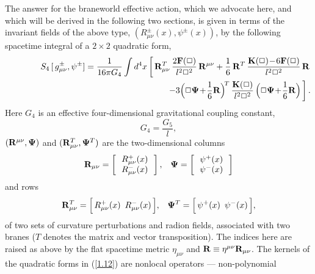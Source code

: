 \documentclass[a4paper,preprint,nofootinbib,
                 showpacs,preprintnumbers,amsmath,amssymb]{revtex4}
\begin{document}
The answer for the braneworld effective action, which we advocate here, 
and which will be derived in the following two sections, 
is given in terms of the invariant fields of the above type, 
$(R^\pm_{\mu\nu}(x),\psi^\pm(x))$, by the following spacetime 
integral of a $2\times2$ quadratic form, 
   \begin{eqnarray} 
   &&S_4\,[\,g^\pm_{\mu\nu},\psi^\pm] 
   =\frac1{16\pi G_4}\int d^4x \left[\,{\bf R}^T_{\mu\nu}\, 
   \frac{2{\bf F}(\Box)}{l^2\Box^2}\,{\bf R}^{\mu\nu} 
   +\frac16\,{\bf R}^{T}\, 
   \frac{{\bf K}(\Box)\!-\!6{\bf F}(\Box)}{l^2\Box^2} 
   \,{\bf R}\right.\nonumber\\ 
   &&\qquad\qquad\qquad\qquad\qquad\qquad\qquad\qquad\qquad 
   \left.-3\Big(\Box{\bf\Psi}\!+\!\frac16{\bf R}\Big)^{\!T}\, 
   \frac{{\bf K}(\Box)}{l^2\Box^2}\, 
   \Big(\Box{\bf\Psi}\!+\!\frac16{\bf R}\Big)\,\right].      \label{1.12} 
   \end{eqnarray} 
Here $G_4$ is an effective four-dimensional gravitational coupling 
constant, 
    \begin{equation} 
    G_4=\frac{G_5}l,                     \label{1.12a} 
    \end{equation} 
$({\bf R}^{\mu\nu},{\bf\Psi})$ and $({\bf 
R}^T_{\mu\nu},{\bf\Psi}^T)$ are the two-dimensional columns 
  \begin{eqnarray} 
   {\bf R}_{\mu\nu} = 
   \left[\begin{array}{c} 
      \,R_{\mu\nu}^+(x)\, \\ \,R_{\mu\nu}^-(x)\, 
  \end{array}\right],\,\,\,\,\, 
  {\bf\Psi}=\left[\begin{array}{c} 
      \,\psi^+(x)\, \\ \, \psi^-(x)\, 
  \end{array}\right]                       \label{1.13a} 
   \end{eqnarray} 
and rows 
   \begin{eqnarray} 
   {\bf R}^T_{\mu\nu}= 
   \Big[\,R^+_{\mu\nu}(x)\,\,\, 
   R^-_{\mu\nu}(x)\,\Big],\,\,\,\,\, 
   {\bf\Psi}^T=\Big[\,\psi^+(x) 
   \,\,\,\psi^-(x)\,\Big],                   \label{1.13} 
  \end{eqnarray} 
of two sets of curvature perturbations and radion fields, 
associated with two branes ($T$ denotes the matrix and vector 
transposition). The indices here are raised as above by the flat 
spacetime metric $\eta_{\mu\nu}$ and ${\bf 
R}\equiv\eta^{\mu\nu}{\bf R}_{\mu\nu}$. The kernels of the quadratic 
forms in (\ref{1.12}) are nonlocal operators --- non-polynomial 
\end{document}
